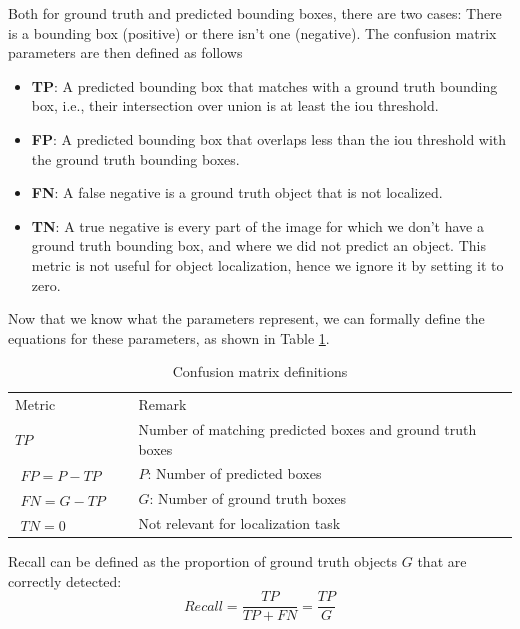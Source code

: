 Both for ground truth and predicted bounding boxes, there are two cases: There is a bounding box (positive) or there isn't one (negative). The confusion matrix parameters are then defined as follows
\begin{itemize}
    \item \textbf{TP}: A predicted bounding box that matches with a ground truth bounding box, i.e., their intersection over union is at least the \acrshort{iou} threshold.
    \item \textbf{FP}: A predicted bounding box that overlaps less than the \acrshort{iou} threshold with the ground truth bounding boxes.
    \item \textbf{FN}: A false negative is a ground truth object that is not localized. 
    \item \textbf{TN}: A true negative is every part of the image for which we don't have a ground truth bounding box, and where we did not predict an object. This metric is not useful for object localization, hence we ignore it by setting it to zero.
\end{itemize}
Now that we know what the parameters represent, we can formally define the equations for these parameters, as shown in Table \ref{tab:confusion_matrix_definitions}.
\begin{table}[ht]
\centering
\begin{tabular}{lll}
  \toprule
  Metric & & Remark\\
  \cmidrule(lr){1-1} \cmidrule(lr){3-3}
  $TP$ & & Number of matching predicted boxes and ground truth boxes\\
  $\begin{aligned} FP = P - TP \end{aligned}$ & & $P$: Number of predicted boxes\\
  $\begin{aligned} FN = G - TP \end{aligned}$ & &$G$: Number of ground truth boxes \\
  $\begin{aligned} TN = 0 \end{aligned}$ & & Not relevant for localization task\\
  \bottomrule 
\end{tabular}
\caption[Confusion matrix definitions]{Confusion matrix definitions}
\label{tab:confusion_matrix_definitions}
\end{table}

Recall can be defined as the proportion of ground truth objects $G$ that are correctly detected:
\begin{equation} \label{eq:recall}
Recall = \frac{TP}{TP + FN} = \frac{TP}{G}
\end{equation}

